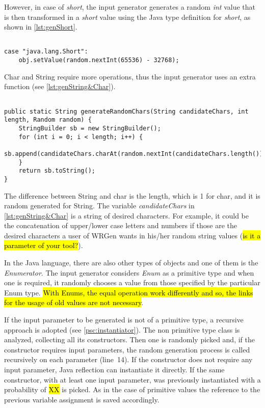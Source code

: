 However, in case of \textit{short}, the input generator generates a random \textit{int} value that is then transformed in a \textit{short} value using the Java type definition for \textit{short}, as shown in \autoref{lst:genShort}.

\begin{lstlisting}[caption={Random short generator},label={lst:genShort}]% Start your code-block
	
case "java.lang.Short":
	obj.setValue(random.nextInt(65536) - 32768);
\end{lstlisting}

Char and String require more operations, thus the input generator uses an extra function (see \autoref{lst:genString&Char}).

\begin{lstlisting}[caption={Random String/char generator},label={lst:genString&Char}]% Start your code-block

public static String generateRandomChars(String candidateChars, int length, Random random) {
	StringBuilder sb = new StringBuilder();
	for (int i = 0; i < length; i++) {
		sb.append(candidateChars.charAt(random.nextInt(candidateChars.length())));
	}
	return sb.toString();
}
\end{lstlisting}

The difference between String and char is the length, which is 1 for char, and it is random generated for String. The variable \emph{candidateChars} in \autoref{lst:genString&Char} is a string of desired characters. For example, it could be the concatenation of upper/lower case letters and numbers if those are the desired characters a user of WRGen wants in his/her random string values (\hl{is it a parameter of your tool?}).

In the Java language, there are also other types of objects and one of them is the \textit{Enumerator}. The input generator considers \textit{Enum} as a primitive type and when one is required, it randomly chooses a value from those specified by the particular Enum type. \hl{With Enums, the equal operation work differently and so, the links for the usage of old values are not necessary}. 

If the input parameter to be generated is not of a primitive type, a recursive approach is adopted (see \autoref{psc:instantiator}). The non primitive type class is analyzed, collecting all its constructors. Then one is randomly picked and, if the constructor requires input parameters, the random generation process is called recursively on each parameter (line~14). If the constructor does not require any input parameter, Java reflection can instantiate it directly. If the same constructor, with at least one input parameter, was previously instantiated with a probability of \hl{XX} is picked. As in the case of primitive values the reference to the previous variable assignment is saved accordingly.

